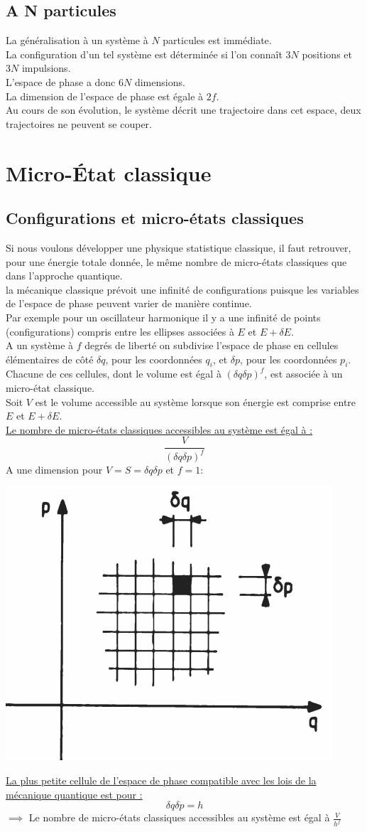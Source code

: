 \documentclass[12pt,oneside]{book}
\begin{document}
\subsection{A N particules}
La généralisation à un système à $N$ particules est immédiate.\\
La configuration d'un tel système est déterminée si l'on connaît $3N$ positions et $3N$ impulsions.\\
L'espace de phase a donc $6N$ dimensions.\\
La dimension de l'espace de phase est égale à $2f$.\\

Au cours de son évolution, le système décrit une trajectoire dans cet espace, deux trajectoires ne peuvent se couper.
\section{Micro-État classique}
\subsection{Configurations et micro-états classiques}
Si nous voulons développer une physique statistique classique, il faut retrouver, pour une énergie totale donnée, le même nombre de micro-états classiques que dans l'approche quantique.\\
la mécanique classique prévoit une infinité de configurations puisque les variables de l'espace de phase peuvent varier de manière continue.\\
Par exemple pour un oscillateur harmonique il y a une infinité de points (configurations) compris entre les ellipses associées à $E $ et $E +\delta E$.\\
A un système à $f$ degrés de liberté on subdivise l'espace de phase en cellules élémentaires de côté $\delta q$, pour les coordonnées $q_i$, et $\delta p$, pour les coordonnées $p_i$.\\
Chacune de ces cellules, dont le volume est égal à $(\delta q \delta p)^f$, est associée à un micro-état classique.\\
Soit $V$ est le volume accessible au système lorsque son énergie est comprise entre $E$ et $E + \delta E$.\\
\underline{Le nombre de micro-états classiques accessibles au système est égal à :}
\[\boxed{\frac{V}{(\delta q \delta p)^f}}\]
A une dimension pour $V = S = \delta q \delta p$ et $f =1$:
\begin{center}
	\includegraphics[width=0.3\linewidth]{../pic/3306/11.png}
\end{center}
\underline{La plus petite cellule de l'espace de phase compatible avec les lois de la mécanique quantique est pour :}
\[\boxed{\delta q \delta p = h}\]
$\implies $ Le nombre de micro-états classiques accessibles au système est égal à $\frac{V}{h^f}$
\end{document}
